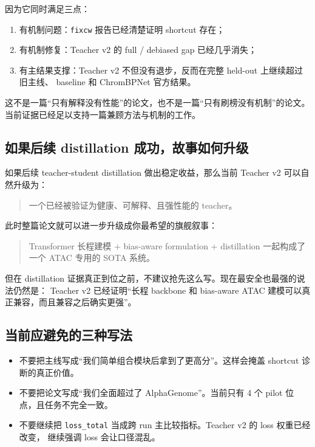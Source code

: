 \documentclass[11pt,a4paper]{ctexart}
\begin{document}
因为它同时满足三点：
\begin{enumerate}[leftmargin=2em]
  \item 有机制问题：\texttt{fixcw} 报告已经清楚证明 shortcut 存在；
  \item 有机制修复：Teacher v2 的 full / debiased gap 已经几乎消失；
  \item 有主结果支撑：Teacher v2 不但没有退步，反而在完整 held-out 上继续超过旧主线、
  baseline 和 ChromBPNet 官方结果。
\end{enumerate}

这不是一篇“只有解释没有性能”的论文，也不是一篇“只有刷榜没有机制”的论文。
当前证据已经足以支持一篇兼顾方法与机制的工作。

\subsection{如果后续 distillation 成功，故事如何升级}

如果后续 teacher-student distillation 做出稳定收益，那么当前 Teacher v2 可以自然升级为：
\begin{quote}
一个已经被验证为健康、可解释、且强性能的 teacher。
\end{quote}

此时整篇论文就可以进一步升级成你最希望的旗舰叙事：
\begin{quote}
Transformer 长程建模 + bias-aware formulation + distillation 一起构成了一个 ATAC 专用的
SOTA 系统。
\end{quote}

但在 distillation 证据真正到位之前，不建议抢先这么写。现在最安全也最强的说法仍然是：
Teacher v2 已经证明“长程 backbone 和 bias-aware ATAC 建模可以真正兼容，而且兼容之后确实更强”。

\subsection{当前应避免的三种写法}

\begin{itemize}[leftmargin=2em]
  \item 不要把主线写成“我们简单组合模块后拿到了更高分”。这样会掩盖 shortcut 诊断的真正价值。
  \item 不要把论文写成“我们全面超过了 AlphaGenome”。当前只有 4 个 pilot 位点，且任务不完全一致。
  \item 不要继续把 \texttt{loss\_total} 当成跨 run 主比较指标。Teacher v2 的 loss 权重已经改变，
  继续强调 loss 会让口径混乱。
\end{itemize}
\end{document}
